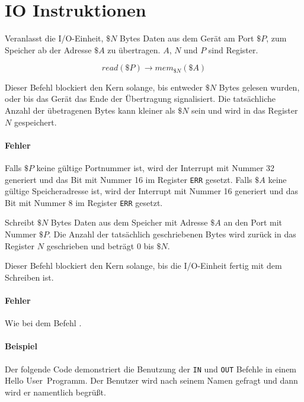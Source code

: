 \section{IO Instruktionen}
\label{sec:IO-Instruktionen}




Veranlasst die I/O-Einheit, $\$N$ Bytes Daten aus dem Gerät am Port $\$P$, zum
Speicher ab der Adresse $\$A$ zu übertragen. $A$, $N$ und $P$ sind Register.

\[
  read(\$P) \to mem_{\$N}(\$A)
\]

Dieser Befehl blockiert den Kern solange, bis entweder $\$N$ Bytes gelesen
wurden, oder bis das Gerät das Ende der Übertragung signalisiert. Die
tatsächliche Anzahl der übetragenen Bytes kann kleiner als $\$N$ sein und wird
in das Register $N$ gespeichert.


\paragraph{Fehler}
Falls $\$P$ keine gültige Portnummer ist, wird der Interrupt mit Nummer 32
generiert und das Bit mit Nummer 16 im Register \texttt{ERR} gesetzt.
Falls $\$A$ keine gültige Speicheradresse ist, wird der Interrupt mit Nummer 16
generiert und das Bit mit Nummer 8 im Register \texttt{ERR} gesetzt.


Schreibt $\$N$ Bytes Daten aus dem Speicher mit Adresse $\$A$ an den Port mit
Nummer $\$P$. Die Anzahl der tatsächlich geschriebenen Bytes wird zurück in das
Register $N$ geschrieben und beträgt $0$ bis $\$N$.

Dieser Befehl blockiert den Kern solange, bis die I/O-Einheit fertig mit dem
Schreiben ist.

\paragraph{Fehler}
Wie bei dem Befehl .


\paragraph{Beispiel}
Der folgende Code demonstriert die Benutzung der \texttt{IN} und \texttt{OUT}
Befehle in einem \glqq Hello User\grqq\ Programm. Der Benutzer wird nach seinem
Namen gefragt und dann wird er namentlich begrüßt.

